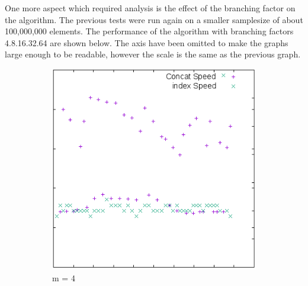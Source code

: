 \documentclass[11pt,a4paper,oneside]{article}
\begin{document}
One more aspect which required analysis is the effect of the branching factor on the algorithm. The previous tests were run again on a smaller samplesize of about 100,000,000 elements. The performance of the algorithm with branching factors 4.8.16.32.64 are shown below. The axis have been omitted to make the graphs large enough to be readable, however the scale is the same as the previous graph.

\begin{figure}[H]
    \centering
    \begin{subfigure}[b]{0.3\textwidth}
        \includegraphics[width=\textwidth]{img/plot4.png}
        \caption{m = 4}
    \end{subfigure}
    ~ %
    \begin{subfigure}[b]{0.3\textwidth}

\end{subfigure}
\end{figure}
\end{document}
